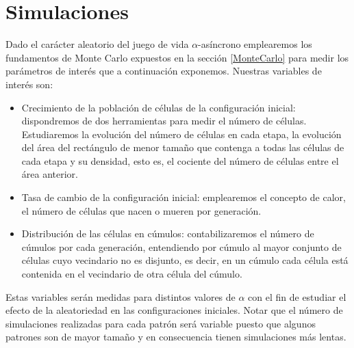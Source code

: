 \documentclass[../proyecto.tex]{memoir}
\begin{document}
\section{Simulaciones} \label{vars}

Dado el carácter aleatorio del juego de vida $\alpha$-asíncrono emplearemos los fundamentos de Monte Carlo expuestos en la sección \ref{MonteCarlo} para medir los parámetros de interés que a continuación exponemos. Nuestras variables de interés son:

\begin{itemize}
\item Crecimiento de la población de células de la configuración inicial: dispondremos de dos herramientas para medir el número de células. Estudiaremos la evolución del número de células en cada etapa, la evolución del área del rectángulo de menor tamaño que contenga a todas las células de cada etapa y su densidad, esto es, el cociente del número de células entre el área anterior.
\item Tasa de cambio de la configuración inicial: emplearemos el concepto de calor, el número de células que nacen o mueren por generación.
\item Distribución de las células en cúmulos: contabilizaremos el número de cúmulos por cada generación, entendiendo por cúmulo al mayor conjunto de células cuyo vecindario no es disjunto, es decir, en un cúmulo cada célula está contenida en el vecindario de otra célula del cúmulo.
\end{itemize}

Estas variables serán medidas para distintos valores de $\alpha$ con el fin de estudiar el efecto de la aleatoriedad en las configuraciones iniciales. Notar que el número de simulaciones realizadas para cada patrón será variable puesto que algunos patrones son de mayor tamaño y en consecuencia tienen simulaciones más lentas.

\end{document}
